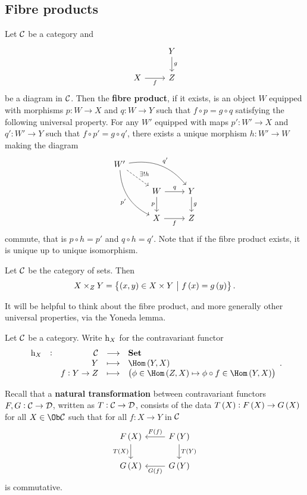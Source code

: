 \pagebreak

\subsection{Fibre products}

Let $ \mathcal{C} $ be a category and
$$
\begin{tikzcd}
& Y \arrow{d}{g} \\
X \arrow{r}[swap]{f} & Z
\end{tikzcd}
$$
be a diagram in $ \mathcal{C} $. Then the \textbf{fibre product}, if it exists, is an object $ W $ equipped with morphisms $ p : W \to X $ and $ q : W \to Y $ such that $ f \circ p = g \circ q $ satisfying the following universal property. For any $ W' $ equipped with maps $ p' : W' \to X $ and $ q' : W' \to Y $ such that $ f \circ p' = g \circ q' $, there exists a unique morphism $ h : W' \to W $ making the diagram
$$
\begin{tikzcd}
W' \arrow[dashed]{dr}{\exists !h} \arrow[bend left=30]{drr}{q'} \arrow[bend right=30]{ddr}[swap]{p'} & & \\
& W \arrow{r}{q} \arrow{d}[swap]{p} & Y \arrow{d}{g} \\
& X \arrow{r}[swap]{f} & Z
\end{tikzcd}
$$
commute, that is $ p \circ h = p' $ and $ q \circ h = q' $. Note that if the fibre product exists, it is unique up to unique isomorphism.

\begin{example*}
Let $ \mathcal{C} $ be the category of sets. Then
$$ X \times_Z Y = \cbr{\br{x, y} \in X \times Y \st f\br{x} = g\br{y}}. $$
\end{example*}

It will be helpful to think about the fibre product, and more generally other universal properties, via the Yoneda lemma.

\begin{definition*}
Let $ \mathcal{C} $ be a category. Write $ \mathrm{h}_X $ for the contravariant functor
$$ \functions[\h_X]{\CCC}{\Set}{Y}{\Hom\br{Y, X}}{f : Y \to Z}{\br{\phi \in \Hom\br{Z, X} \mapsto \phi \circ f \in \Hom\br{Y, X}}}. $$
\end{definition*}

Recall that a \textbf{natural transformation} between contravariant functors $ F, G : \mathcal{C} \to \mathcal{D} $, written as $ T : \mathcal{C} \to \mathcal{D} $, consists of the data $ T\br{X} : F\br{X} \to G\br{X} $ for all $ X \in \Ob \CCC $ such that for all $ f : X \to Y $ in $ \mathcal{C} $
$$
\begin{tikzcd}
F\br{X} \arrow{d}[swap]{T\br{X}} & F\br{Y} \arrow{l}[swap]{F\br{f}} \arrow{d}{T\br{Y}} \\
G\br{X} & G\br{Y} \arrow{l}{G\br{f}}
\end{tikzcd}
$$
is commutative.

